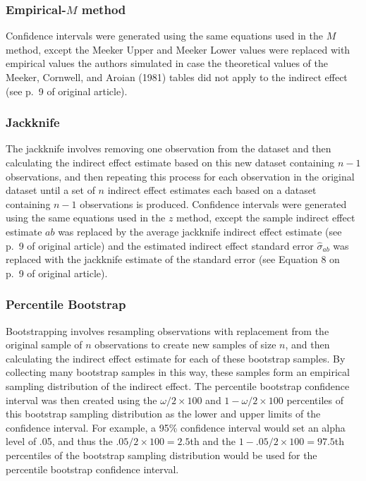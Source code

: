 \documentclass[10,a4paperpaper,]{article}
\begin{document}
\subsubsection{Empirical-$M$ method}

Confidence intervals were generated using the same equations used in the
\(M\) method, except the Meeker Upper and Meeker Lower values were
replaced with empirical values the authors simulated in case the
theoretical values of the Meeker, Cornwell, and Aroian (1981) tables did
not apply to the indirect effect (see p.~9 of original article).

\subsubsection{Jackknife}

The jackknife involves removing one observation from the dataset and
then calculating the indirect effect estimate based on this new dataset
containing \(n-1\) observations, and then repeating this process for
each observation in the original dataset until a set of \(n\) indirect
effect estimates each based on a dataset containing \(n-1\) observations
is produced. Confidence intervals were generated using the same
equations used in the \(z\) method, except the sample indirect effect
estimate \(ab\) was replaced by the average jackknife indirect effect
estimate (see p.~9 of original article) and the estimated indirect
effect standard error \(\hat{\sigma}_{ab}\) was replaced with the
jackknife estimate of the standard error (see Equation 8 on p.~9 of
original article).

\subsubsection{Percentile Bootstrap}

Bootstrapping involves resampling observations with replacement from the
original sample of \(n\) observations to create new samples of size
\(n\), and then calculating the indirect effect estimate for each of
these bootstrap samples. By collecting many bootstrap samples in this
way, these samples form an empirical sampling distribution of the
indirect effect. The percentile bootstrap confidence interval was then
created using the \(\omega/2 \times 100\) and \(1- \omega/2 \times 100\)
percentiles of this bootstrap sampling distribution as the lower and
upper limits of the confidence interval. For example, a 95\% confidence
interval would set an alpha level of .05, and thus the
\(.05/2 \times 100 = 2.5\)th and the \(1- .05/2 \times 100 = 97.5\)th
percentiles of the bootstrap sampling distribution would be used for the
percentile bootstrap confidence interval.
\end{document}
